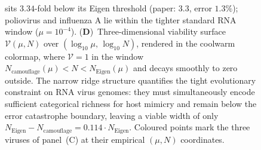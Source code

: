 \begin{figure}[!htbp]
{    sits $3.34$-fold below its Eigen threshold (paper: $3.3$, error $1.3\%$);
    poliovirus and influenza A lie within the tighter standard RNA window
    ($\mu = 10^{-4}$).
    (\textbf{D})~Three-dimensional viability surface $\mathcal{V}(\mu, N)$
    over $(\log_{10}\mu,\, \log_{10} N)$, rendered in the coolwarm colormap,
    where $\mathcal{V} = 1$ in the window
    $N_{\mathrm{camouflage}}(\mu) < N < N_{\mathrm{Eigen}}(\mu)$ and
    decays smoothly to zero outside.
    The narrow ridge structure quantifies the tight evolutionary constraint
    on RNA virus genomes: they must simultaneously encode sufficient
    categorical richness for host mimicry and remain below the error
    catastrophe boundary, leaving a viable width of only
    $N_{\mathrm{Eigen}} - N_{\mathrm{camouflage}} = 0.114 \cdot N_{\mathrm{Eigen}}$.
    Coloured points mark the three viruses of panel~(C) at their empirical
    $(\mu, N)$ coordinates.}
    \label{fig:viral_panel6}
\end{figure}
